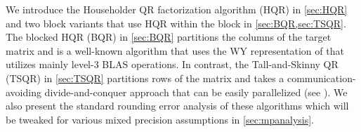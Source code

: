 We introduce the Householder QR factorization algorithm (HQR) in \cref{sec:HQR} and two block variants that use HQR within the block in \cref{sec:BQR,sec:TSQR}. 
The blocked HQR (BQR) in \cref{sec:BQR} partitions the columns of the target matrix  and is a well-known algorithm that uses the WY representation of \cite{Bischof1987} that utilizes mainly level-3 BLAS operations.
In contrast, the Tall-and-Skinny QR (TSQR) in \cref{sec:TSQR} partitions rows of the matrix and takes a communication-avoiding divide-and-conquer approach that can be easily parallelized (see \cite{Demmel2007}).
We also present the standard rounding error analysis of these algorithms which will be tweaked for various mixed precision assumptions in \cref{sec:mpanalysis}.


